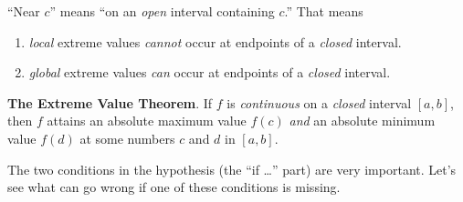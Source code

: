 \documentclass[../main.tex]{subfiles}
\begin{document}
``Near \(c\)'' means ``on an \emph{open} interval containing \(c\).''  That means
\begin{enumerate}
  \item \emph{local} extreme values \emph{cannot} occur at endpoints of a \emph{closed} interval. 
  \item \emph{global} extreme values \emph{can} occur at endpoints of a \emph{closed} interval.
\end{enumerate}
\begin{center}
  \hfill
  \hfill
\end{center}
\clearpage
 
\begin{mdframed}[style=withref]
  \textbf{The Extreme Value Theorem}. If \(f\) is \emph{continuous} on a \emph{closed} interval \([a,b]\), then \(f\) attains an absolute maximum value \(f(c)\) \emph{and} an absolute minimum value \(f(d)\) at some numbers \(c\) and \(d\) in \([a,b]\).

\end{mdframed}

The two conditions in the hypothesis (the ``if \ldots{}'' part) are very important. Let's see what can go wrong if one of these conditions is missing.
\medskip
\end{document}
